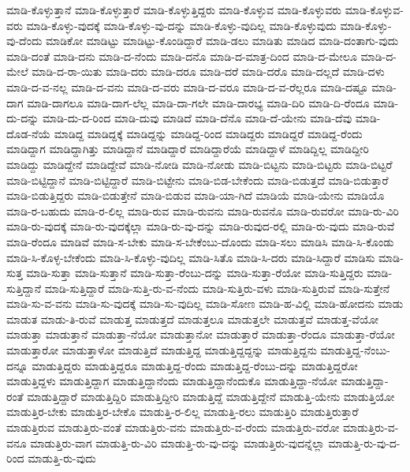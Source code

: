 {ಮಾಡಿ-ಕೊಳ್ಳುತ್ತಾನೆ
ಮಾಡಿ-ಕೊಳ್ಳುತ್ತಾರೆ
ಮಾಡಿ-ಕೊಳ್ಳುತ್ತಿದ್ದರು
ಮಾಡಿ-ಕೊಳ್ಳುವ
ಮಾಡಿ-ಕೊಳ್ಳುವರು
ಮಾಡಿ-ಕೊಳ್ಳುವ-ವರು
ಮಾಡಿ-ಕೊಳ್ಳು-ವುದಕ್ಕೆ
ಮಾಡಿ-ಕೊಳ್ಳು-ವು-ದನ್ನು
ಮಾಡಿ-ಕೊಳ್ಳು-ವುದಿಲ್ಲ
ಮಾಡಿ-ಕೊಳ್ಳುವುದು
ಮಾಡಿ-ಕೊಳ್ಳು-ವು-ದೆಂದು
ಮಾಡಿಕೋ
ಮಾಡಿಟ್ಟು
ಮಾಡಿಟ್ಟು-ಕೊಂಡಿದ್ದಾರೆ
ಮಾಡಿ-ಡಲು
ಮಾಡಿತು
ಮಾಡಿದ
ಮಾಡಿ-ದಂತಾಗು-ವುದು
ಮಾಡಿ-ದಂತೆ
ಮಾಡಿ-ದನು
ಮಾಡಿ-ದ-ನೆಂದು
ಮಾಡಿ-ದನೊ
ಮಾಡಿ-ದ-ಮಾತ್ರ-ದಿಂದ
ಮಾಡಿ-ದ-ಮೇಲೂ
ಮಾಡಿ-ದ-ಮೇಲೆ
ಮಾಡಿ-ದ-ರಾ-ಯಿತು
ಮಾಡಿ-ದರು
ಮಾಡಿ-ದರೂ
ಮಾಡಿ-ದರೆ
ಮಾಡಿ-ದರೊ
ಮಾಡಿ-ದಲ್ಲದೆ
ಮಾಡಿ-ದಳು
ಮಾಡಿ-ದ-ವ-ನಲ್ಲ
ಮಾಡಿ-ದ-ವನು
ಮಾಡಿ-ದ-ವರು
ಮಾಡಿ-ದ-ವರೂ
ಮಾಡಿ-ದ-ವ-ರೆಲ್ಲರೂ
ಮಾಡಿ-ದಷ್ಟೂ
ಮಾಡಿ-ದಾಗ
ಮಾಡಿ-ದಾಗಲೂ
ಮಾಡಿ-ದಾಗ-ಲೆಲ್ಲ
ಮಾಡಿ-ದಾ-ಗಲೇ
ಮಾಡಿ-ದಾರಭ್ಯ
ಮಾಡಿ-ದಿರಿ
ಮಾಡಿ-ದಿ-ರೆಂದೂ
ಮಾಡಿ-ದು-ದನ್ನು
ಮಾಡಿ-ದು-ದ-ರಿಂದ
ಮಾಡಿ-ದುವು
ಮಾಡಿದೆ
ಮಾಡಿ-ದೆನೊ
ಮಾಡಿ-ದೆ-ಯೇನು
ಮಾಡಿ-ದೆವು
ಮಾಡಿ-ದೊಡ-ನೆಯೆ
ಮಾಡಿದ್ದ
ಮಾಡಿದ್ದಕ್ಕೆ
ಮಾಡಿದ್ದನ್ನು
ಮಾಡಿದ್ದ-ರಿಂದ
ಮಾಡಿದ್ದರು
ಮಾಡಿದ್ದರೆ
ಮಾಡಿದ್ದ-ರೆಂದು
ಮಾಡಿದ್ದಾಗ
ಮಾಡಿದ್ದಾಗಿತ್ತು
ಮಾಡಿದ್ದಾನೆ
ಮಾಡಿದ್ದಾರೆ
ಮಾಡಿದ್ದಾರೆಯೆ
ಮಾಡಿದ್ದಾಳೆ
ಮಾಡಿದ್ದಿಲ್ಲ
ಮಾಡಿದ್ದೀರಿ
ಮಾಡಿದ್ದು
ಮಾಡಿದ್ದೇನೆ
ಮಾಡಿದ್ದೇವೆ
ಮಾಡಿ-ನೋಡಿ
ಮಾಡಿ-ನೋಡು
ಮಾಡಿ-ಬಿಟ್ಟನು
ಮಾಡಿ-ಬಿಟ್ಟರು
ಮಾಡಿ-ಬಿಟ್ಟರೆ
ಮಾಡಿ-ಬಿಟ್ಟಿದ್ದಾನೆ
ಮಾಡಿ-ಬಿಟ್ಟಿದ್ದಾರೆ
ಮಾಡಿ-ಬಿಟ್ಟೇನು
ಮಾಡಿ-ಬಿಡ-ಬೇಕೆಂದು
ಮಾಡಿ-ಬಿಡುತ್ತದೆ
ಮಾಡಿ-ಬಿಡುತ್ತಾರೆ
ಮಾಡಿ-ಬಿಡುತ್ತಿದ್ದರು
ಮಾಡಿ-ಬಿಡುತ್ತೇನೆ
ಮಾಡಿ-ಬಿಡುವ
ಮಾಡಿ-ಯಾ-ಗಿದೆ
ಮಾಡಿಯೆ
ಮಾಡಿ-ಯೇನು
ಮಾಡಿಯೊ
ಮಾಡಿ-ರ-ಬಹುದು
ಮಾಡಿ-ರ-ಲಿಲ್ಲ
ಮಾಡಿ-ರುವ
ಮಾಡಿ-ರುವನು
ಮಾಡಿ-ರುವನೊ
ಮಾಡಿ-ರುವರೋ
ಮಾಡಿ-ರು-ವಿರಿ
ಮಾಡಿ-ರು-ವುದಕ್ಕೆ
ಮಾಡಿ-ರು-ವುದಕ್ಕೆಲ್ಲಾ
ಮಾಡಿ-ರು-ವು-ದನ್ನು
ಮಾಡಿ-ರುವುದ-ರಲ್ಲಿ
ಮಾಡಿ-ರು-ವುದು
ಮಾಡಿ-ರುವೆ
ಮಾಡಿ-ರೆಂದೂ
ಮಾಡಿವೆ
ಮಾಡಿ-ಸ-ಬೇಕು
ಮಾಡಿ-ಸ-ಬೇಕೆಂಬು-ದೊಂದು
ಮಾಡಿ-ಸಲು
ಮಾಡಿಸಿ
ಮಾಡಿ-ಸಿ-ಕೊಂಡು
ಮಾಡಿ-ಸಿ-ಕೊಳ್ಳ-ಬೇಕೆಂದು
ಮಾಡಿ-ಸಿ-ಕೊಳ್ಳು-ವುದಿಲ್ಲ
ಮಾಡಿ-ಸಿತೊ
ಮಾಡಿ-ಸಿ-ದರು
ಮಾಡಿ-ಸಿದ್ದಾರೆ
ಮಾಡಿಸು
ಮಾಡಿ-ಸುತ್ತ
ಮಾಡಿ-ಸುತ್ತಾ
ಮಾಡಿ-ಸುತ್ತಾನೆ
ಮಾಡಿ-ಸುತ್ತಾ-ರೆಂಬು-ದನ್ನು
ಮಾಡಿ-ಸುತ್ತಾ-ರೆಯೋ
ಮಾಡಿ-ಸುತ್ತಿದ್ದರು
ಮಾಡಿ-ಸುತ್ತಿದ್ದಾನೆ
ಮಾಡಿ-ಸುತ್ತಿದ್ದಾರೆ
ಮಾಡಿ-ಸುತ್ತಿ-ರು-ವ-ನೆಂದು
ಮಾಡಿ-ಸುತ್ತಿರು-ವಳು
ಮಾಡಿ-ಸುತ್ತಿರುವೆ
ಮಾಡಿ-ಸುತ್ತೇನೆ
ಮಾಡಿ-ಸು-ವ-ವನು
ಮಾಡಿ-ಸು-ವುದಕ್ಕೆ
ಮಾಡಿ-ಸು-ವುದಿಲ್ಲ
ಮಾಡಿ-ಸೋಣ
ಮಾಡಿ-ಹ-ವಿಲ್ಲಿ
ಮಾಡಿ-ಹೋದನು
ಮಾಡು
ಮಾಡುತ
ಮಾಡು-ತಿ-ರುವೆ
ಮಾಡುತ್ತ
ಮಾಡುತ್ತದೆ
ಮಾಡುತ್ತಲೂ
ಮಾಡುತ್ತಲೇ
ಮಾಡುತ್ತವೆ
ಮಾಡುತ್ತ-ವೆಯೋ
ಮಾಡುತ್ತಾ
ಮಾಡುತ್ತಾನೆ
ಮಾಡುತ್ತಾ-ನೆಯೋ
ಮಾಡುತ್ತಾನೋ
ಮಾಡುತ್ತಾರೆ
ಮಾಡುತ್ತಾ-ರೆಂದೂ
ಮಾಡುತ್ತಾ-ರೆಯೋ
ಮಾಡುತ್ತಾರೋ
ಮಾಡುತ್ತಾಳೋ
ಮಾಡುತ್ತಿದೆ
ಮಾಡುತ್ತಿದ್ದ
ಮಾಡುತ್ತಿದ್ದದ್ದನ್ನು
ಮಾಡುತ್ತಿದ್ದನು
ಮಾಡುತ್ತಿದ್ದ-ನೆಂಬು-ದನ್ನೂ
ಮಾಡುತ್ತಿದ್ದರು
ಮಾಡುತ್ತಿದ್ದರೂ
ಮಾಡುತ್ತಿದ್ದ-ರೆಂದು
ಮಾಡುತ್ತಿದ್ದ-ರೆಂಬು-ದನ್ನು
ಮಾಡುತ್ತಿದ್ದರೋ
ಮಾಡುತ್ತಿದ್ದಳು
ಮಾಡುತ್ತಿದ್ದಾಗ
ಮಾಡುತ್ತಿದ್ದಾನೆಂದು
ಮಾಡುತ್ತಿದ್ದಾನೆಂದುಕೊ
ಮಾಡುತ್ತಿದ್ದಾ-ನೆಯೋ
ಮಾಡುತ್ತಿದ್ದಾ-ರಂತೆ
ಮಾಡುತ್ತಿದ್ದಾರೆ
ಮಾಡುತ್ತಿದ್ದಿರಿ
ಮಾಡುತ್ತಿದ್ದೀರಿ
ಮಾಡುತ್ತಿದ್ದೆ
ಮಾಡುತ್ತಿದ್ದೇನೆ
ಮಾಡುತ್ತಿ-ಯೇನು
ಮಾಡುತ್ತಿಯೋ
ಮಾಡುತ್ತಿರ-ಬೇಕು
ಮಾಡುತ್ತಿರ-ಬೇಕೊ
ಮಾಡುತ್ತಿ-ರ-ಲಿಲ್ಲ
ಮಾಡುತ್ತಿ-ರಲು
ಮಾಡುತ್ತಿರಿ
ಮಾಡುತ್ತಿರುತ್ತಾರೆ
ಮಾಡುತ್ತಿರುವ
ಮಾಡುತ್ತಿರು-ವಂತೆ
ಮಾಡುತ್ತಿರು-ವನು
ಮಾಡುತ್ತಿರು-ವ-ರೆಂದು
ಮಾಡುತ್ತಿರು-ವರೋ
ಮಾಡುತ್ತಿರು-ವ-ವನೂ
ಮಾಡುತ್ತಿರು-ವಾಗ
ಮಾಡುತ್ತಿ-ರು-ವಿರಿ
ಮಾಡುತ್ತಿ-ರು-ವು-ದನ್ನು
ಮಾಡುತ್ತಿರು-ವುದನ್ನೆಲ್ಲಾ
ಮಾಡುತ್ತಿ-ರು-ವು-ದ-ರಿಂದ
ಮಾಡುತ್ತಿ-ರು-ವುದು
}
